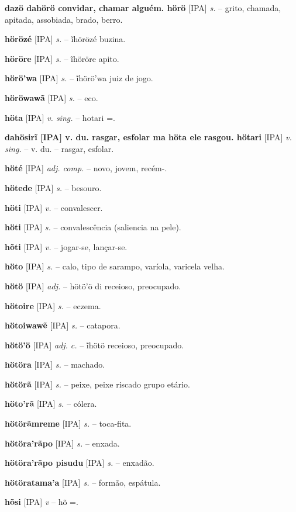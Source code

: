 \textbf{dazö dahörö convidar, chamar alguém. hörö} [IPA] \textit{s.} -- grito, chamada, apitada, assobiada, brado, berro.

\textbf{hörözé} [IPA] \textit{s.} -- ĩhörözé buzina.

\textbf{höröre} [IPA] \textit{s.} -- ĩhöröre apito.

\textbf{hörö'wa} [IPA] \textit{s.} -- ĩhörö'wa juiz de jogo.

\textbf{höröwawã} [IPA] \textit{s.} -- eco.

\textbf{höta} [IPA] \textit{v. sing.} -- hotari =.

\textbf{dahösirĩ [IPA] v. du. rasgar, esfolar  ma höta ele rasgou. hötari} [IPA] \textit{v. sing.} -- v. du. -- rasgar, esfolar.

\textbf{höté} [IPA] \textit{adj. comp.} -- novo, jovem, recém-.

\textbf{hötede} [IPA] \textit{s.} -- besouro.

\textbf{höti} [IPA] \textit{v.} -- convalescer.

\textbf{höti} [IPA] \textit{s.} -- convalescência (saliencia na pele).

\textbf{hõti} [IPA] \textit{v.} -- jogar-se, lançar-se.

\textbf{höto} [IPA] \textit{s.} -- calo, tipo de sarampo, varíola, varicela velha.

\textbf{hötö} [IPA] \textit{adj.} -- hötö'ö di receioso, preocupado.

\textbf{hötoire} [IPA] \textit{s.} -- eczema.

\textbf{hötoiwawẽ} [IPA] \textit{s.} -- catapora.

\textbf{hötö'ö} [IPA] \textit{adj. c.} -- ĩhötö receioso, preocupado.

\textbf{hötöra} [IPA] \textit{s.} -- machado. \href{https://xavante.pythonanywhere.com/static/dicionario/play.html?file=axe.wav}{\faHeadphones}

\textbf{hötörã} [IPA] \textit{s.} -- peixe, peixe riscado  grupo etário.

\textbf{höto'rã} [IPA] \textit{s.} -- cólera.

\textbf{hötörãmreme} [IPA] \textit{s.} -- toca-fita.

\textbf{hötöra'rãpo} [IPA] \textit{s.} -- enxada.

\textbf{hötöra'rãpo pisudu} [IPA] \textit{s.} -- enxadão.

\textbf{hötöratama'a} [IPA] \textit{s.} -- formão, espátula.

\textbf{hõsi} [IPA] \textit{v} -- hõ =.

